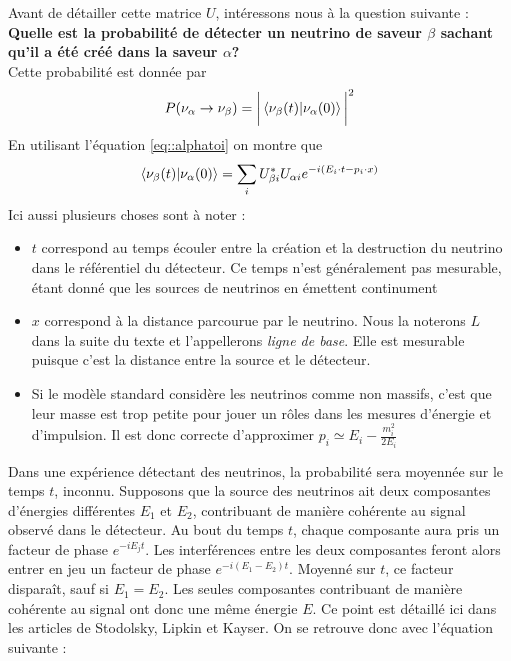             Avant de détailler cette matrice $U$, intéressons nous à la question suivante : \\
            \textbf{Quelle est la probabilité de détecter un neutrino de saveur $\beta$ sachant qu'il a été créé dans la saveur $\alpha$?}\\
            Cette probabilité est donnée par
            \begin{equation}
                P(\nu_{\alpha}\to\nu_{\beta})=\bigg|\braket{\nu_{\beta}(t)}{\nu_{\alpha}(0)}\bigg|^2
            \end{equation}
            En utilisant l'équation \eqref{eq::alphatoi} on montre que
            \begin{equation}
                \braket{\nu_{\beta}(t)}{\nu_{\alpha}(0)} = \sum_i U_{\beta i}^*U_{\alpha i} e^{-i(E_i\cdot t - p_i\cdot x)}
            \end{equation}
            Ici aussi plusieurs choses sont à noter : 
            \begin{itemize}
                \item $t$ correspond au temps écouler entre la création et la destruction du neutrino dans le référentiel du détecteur. Ce temps n'est généralement pas mesurable, étant donné que les sources de neutrinos en émettent continument
                \item $x$ correspond à la distance parcourue par le neutrino. Nous la noterons $L$ dans la suite du texte et l'appellerons \textit{ligne de base}. Elle est mesurable puisque c'est la distance entre la source et le détecteur.
                \item Si le modèle standard considère les neutrinos comme non massifs, c'est que leur masse est trop petite pour jouer un rôles dans les mesures d'énergie et d'impulsion. Il est donc correcte d'approximer $p_i \simeq E_i - \frac{m_i^2}{2E_i}$
            \end{itemize}
            Dans une expérience détectant des neutrinos, la probabilité sera moyennée sur le temps $t$, inconnu. Supposons que la source des neutrinos ait deux composantes d'énergies différentes $E_1$ et $E_2$, contribuant de manière cohérente au signal observé dans le détecteur. Au bout du temps $t$, chaque composante aura pris un facteur de phase $e^{-iE_jt}$. Les interférences entre les deux composantes feront alors entrer en jeu un facteur de phase $e^{-i(E_1-E_2)t}$. Moyenné sur $t$, ce facteur disparaît, sauf si $E_1 = E_2$. Les seules composantes contribuant de manière cohérente au signal ont donc une même énergie $E$. Ce point est détaillé ici dans les articles de Stodolsky\cite{Stodolsky1998}, Lipkin\cite{Lipkin2005} et Kayser\cite{Kayser2005}. On se retrouve donc avec l'équation suivante : 

